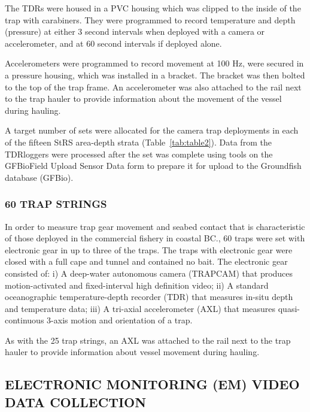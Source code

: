 \documentclass[12pt]{article}\usepackage[]{graphicx}\usepackage[]{color}
\begin{document}
The TDRs were housed in a PVC housing which was clipped to the inside of the trap with carabiners. They were programmed to record temperature and depth (pressure) at either 3 second intervals when deployed with a camera or accelerometer, and at 60 second intervals if deployed alone.

Accelerometers were programmed to record movement at 100 Hz, were secured in a pressure housing, which was installed in a bracket. The bracket was then bolted to the top of the trap frame. An accelerometer was also attached to the rail next to the trap hauler to provide information about the movement of the vessel during hauling.

A target number of sets were allocated for the camera trap deployments in each of the fifteen StRS area-depth strata (Table~\ref{tab:table2}). Data from the TDRloggers were processed after the set was complete using tools on the GFBioField Upload Sensor Data form to prepare it for upload to the Groundfish database (GFBio).

\hypertarget{trap-strings-2}{%
\subsubsection{60 TRAP STRINGS}\label{trap-strings-2}}

In order to measure trap gear movement and seabed contact that is characteristic of those deployed in the commercial fishery in coastal BC., 60 traps were set with electronic gear in up to three of the traps. The traps with electronic gear were closed with a full cape and tunnel and contained no bait. The electronic gear consisted of: i) A deep-water autonomous camera (TRAPCAM) that produces motion-activated and fixed-interval high definition video; ii) A standard oceanographic temperature-depth recorder (TDR) that measures in-situ depth and temperature data; iii) A tri-axial accelerometer (AXL) that measures quasi-continuous 3-axis motion and orientation of a trap.

As with the 25 trap strings, an AXL was attached to the rail next to the trap hauler to provide information about vessel movement during hauling.

\hypertarget{electronic-monitoring-em-video-data-collection}{%
\subsection{ELECTRONIC MONITORING (EM) VIDEO DATA COLLECTION}\label{electronic-monitoring-em-video-data-collection}}
\end{document}
